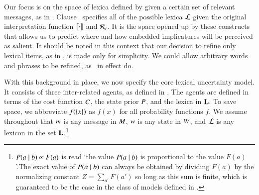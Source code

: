 \documentclass[leqno,12pt]{article}
\begin{document}
Our focus is on the space of lexica defined by
 given a certain set of relevant messages,
as in . Clause~
specifies all of the possible lexica $\mathcal{L}$ given the original
interpretation function $\llbracket\cdot\rrbracket$ and $\mathcal{R}_{c}$. It is the space
opened up by these constructs that allows us to predict where and how
embedded implicatures will be perceived as salient. It should be noted
in this context that our decision to refine only lexical items, as in
, is made only for simplicity. We could
allow arbitrary words and phrases to be refined, as \CFS\ in effect
do.


With this background in place, we now specify the core lexical
uncertainty model. It consists of three inter-related agents, as
defined in . The agents are defined in terms of the cost
function $C$, the state prior $P$, and the lexica in
$\mathbf{L}$. 
To save space, we abbreviate $f(\left\{ x \right\})$ as $f(x)$ for all probability functions $f$.
We assume throughout that $m$ is any message in
$M$, $w$ is any state in $W$, and $\mathcal{L}$ is any
lexicon in the set $\mathbf{L}$.\footnote{$P(a \mid b) \propto F(a)$ is
  read `the value $P(a \mid b)$ is proportional to the value
  $F(a)$'.The exact value of $P(a \mid b)$ can always be obtained by
  dividing $F(a)$ by the normalizing constant $Z=\sum_{a'} F(a')$ so
  long as this sum is finite, which is guaranteed to be the case in
  the class of models defined in .}
%
\end{document}
